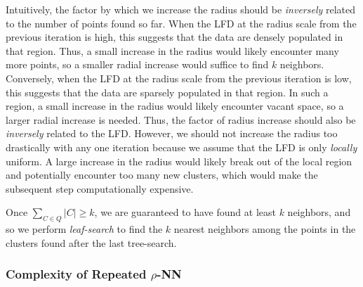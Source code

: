 Intuitively, the factor by which we increase the radius should be \textit{inversely} related to the number of points found so far.
When the LFD at the radius scale from the previous iteration is high, this suggests that the data are densely populated in that region.
Thus, a small increase in the radius would likely encounter many more points, so a smaller radial increase would suffice to find $k$ neighbors.
Conversely, when the LFD at the radius scale from the previous iteration is low, this suggests that the data are sparsely populated in that region.
In such a region, a small increase in the radius would likely encounter vacant space, so a larger radial increase is needed.
Thus, the factor of radius increase should also be \textit{inversely} related to the LFD.
However, we should not increase the radius too drastically with any one iteration because we assume that the LFD is only \textit{locally} uniform.
A large increase in the radius would likely break out of the local region and potentially encounter too many new clusters, which would make the subsequent step computationally expensive.

Once $\sum_{C \in Q} |C| \geq k$, we are guaranteed to have found at least $k$ neighbors, and so we perform \textit{leaf-search} to find the $k$ nearest neighbors among the points in the clusters found after the last tree-search.


\subsubsection{Complexity of Repeated \texorpdfstring{$\rho$}{p}-NN}
\label{sec:methods:knn-search:repeated-rnn-complexity}


